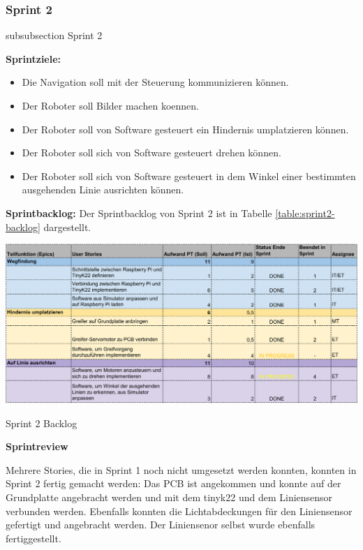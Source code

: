 \newpage



\subsubsection*{Sprint 2}
    {subsubsection}
    {Sprint 2}
    
\textbf{Sprintziele:}
\begin{itemize}
    \item Die Navigation soll mit der Steuerung kommunizieren können.
    \item Der Roboter soll Bilder machen koennen.
    \item Der Roboter soll von Software gesteuert ein Hindernis umplatzieren können.
    \item Der Roboter soll sich von Software gesteuert drehen können.
    \item Der Roboter soll sich von Software gesteuert in dem Winkel einer bestimmten ausgehenden Linie ausrichten können.
\end{itemize}

\textbf{Sprintbacklog:} Der Sprintbacklog von Sprint 2 ist in Tabelle 
\ref{table:sprint2-backlog} 
dargestellt.

\begin{table}[H]
\centering
\includegraphics[width=\textwidth]{assets/projektmanagement/sprint2-crop.pdf}
\caption{Sprint 2 Backlog}
\label{table:sprint2-backlog}
\end{table}


\textbf{Sprintreview}

Mehrere Stories, die in Sprint 1 noch nicht umgesetzt werden konnten, konnten in Sprint 2 fertig gemacht werden: Das PCB ist angekommen und konnte auf der Grundplatte angebracht werden und mit dem \gls{tinyk22} und dem Liniensensor verbunden werden. Ebenfalls konnten die Lichtabdeckungen für den Liniensensor gefertigt und angebracht werden. Der Liniensenor selbst wurde ebenfalls fertiggestellt.

